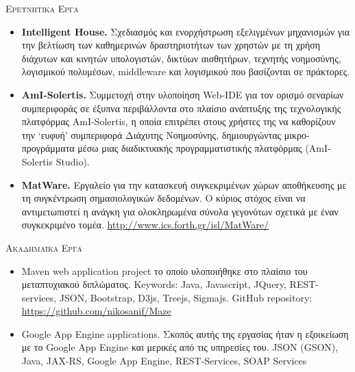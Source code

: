 \documentclass[11pt]{article}
\begin{document}
\textsc{Ερευνητικα Εργα}
\begin{itemize}
\item
\textbf{Intelligent House.} Σχεδιασμός και ενορχήστρωση εξελιγμένων μηχανισμών για την βελτίωση των καθημερινών δραστηριοτήτων των χρηστών με τη χρήση διάχυτων και κινητών υπολογιστών, δικτύων αισθητήρων, τεχνητής νοημοσύνης, λογισμικού πολυμέσων, middleware και λογισμικού που βασίζονται σε πράκτορες.

\item
\textbf{AmI-Solertis.} Συμμετοχή στην υλοποίηση Web-IDE για τον ορισμό σεναρίων συμπεριφοράς σε έξυπνα περιβάλλοντα στο πλαίσιο ανάπτυξης της τεχνολογικής πλατφόρμας AmI-Solertis, η οποία επιτρέπει στους χρήστες της να καθορίζουν την `ευφυή' συμπεριφορά Διάχυτης Νοημοσύνης, δημιουργώντας μικρο-προγράμματα μέσω μιας διαδικτυακής προγραμματιστικής πλατφόρμας (AmI-Solertis Studio).

\item
\textbf{MatWare.} Εργαλείο για την κατασκευή συγκεκριμένων χώρων αποθήκευσης με τη συγκέντρωση σημασιολογικών δεδομένων. Ο κύριος στόχος είναι να αντιμετωπιστεί η ανάγκη για ολοκληρωμένα σύνολα γεγονότων σχετικά με έναν συγκεκριμένο τομέα. \url{http://www.ics.forth.gr/isl/MatWare/}
\end{itemize}

\textsc{Ακαδημαϊκα Εργα}
\begin{itemize}
\item
Maven web application project το οποίο υλοποιήθηκε στο πλαίσιο του μεταπτυχιακού διπλώματος. Keywords: Java, Javascript, JQuery, REST-services, JSON, Bootstrap, D3js, Treejs, Sigmajs. GitHub repository: \url{https://github.com/nikosanif/Maze}
\item
Google App Engine applications. Σκοπός αυτής της εργασίας ήταν η εξοικείωση με το Google App Engine και μερικές από τις υπηρεσίες του. JSON (GSON), Java, JAX-RS, Google App Engine, REST-Services, SOAP Services
\end{itemize}
\end{document}
